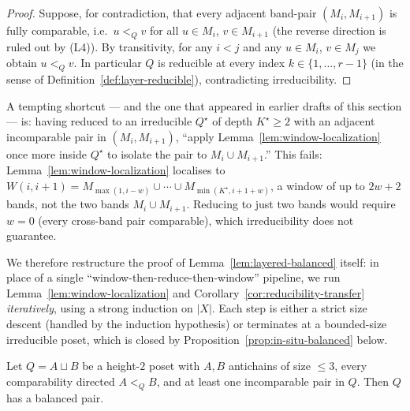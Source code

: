 \begin{proof}
Suppose, for contradiction, that every adjacent band-pair
$(M_i, M_{i+1})$ is fully comparable, i.e.\ $u <_Q v$ for all
$u \in M_i$, $v \in M_{i+1}$ (the reverse direction is ruled out by
(L4)). By transitivity, for any $i < j$ and any $u \in M_i$,
$v \in M_j$ we obtain $u <_Q v$. In particular $Q$ is reducible at
every index $k \in \{1, \ldots, r-1\}$ (in the sense of
Definition~\ref{def:layer-reducible}), contradicting irreducibility.
\end{proof}

\begin{remark}
\label{rem:inner-window-pitfall}
A tempting shortcut --- and the one that appeared in earlier drafts of
this section --- is: having reduced to an irreducible $Q^\star$ of
depth $K^\star \ge 2$ with an adjacent incomparable pair in
$(M_i, M_{i+1})$, ``apply Lemma~\ref{lem:window-localization} once
more inside $Q^\star$ to isolate the pair to $M_i \cup M_{i+1}$.''
This fails: Lemma~\ref{lem:window-localization} localises to
$W(i, i+1) = M_{\max(1, i-w)} \cup \cdots \cup M_{\min(K^\star,
i+1+w)}$, a window of up to $2w + 2$ bands, not the two bands
$M_i \cup M_{i+1}$. Reducing to just two bands would require $w = 0$
(every cross-band pair comparable), which irreducibility does not
guarantee.

We therefore restructure the proof of
Lemma~\ref{lem:layered-balanced} itself: in place of a single
``window-then-reduce-then-window'' pipeline, we run
Lemma~\ref{lem:window-localization} and
Corollary~\ref{cor:reducibility-transfer} \emph{iteratively}, using a
strong induction on $|X|$. Each step is either a strict size descent
(handled by the induction hypothesis) or terminates at a bounded-size
irreducible poset, which is closed by
Proposition~\ref{prop:in-situ-balanced} below.
\end{remark}

\begin{proposition}
\label{prop:bipartite-balanced}
Let $Q = A \sqcup B$ be a height-$2$ poset with $A, B$ antichains of
size $\le 3$, every comparability directed $A <_Q B$, and at least one
incomparable pair in $Q$. Then $Q$ has a balanced pair.
\end{proposition}

